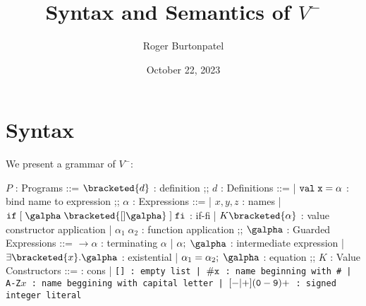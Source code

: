\documentclass[]{article}
\title{Syntax and Semantics of $V^{-}$}
\author{Roger Burtonpatel}
\date{October 22, 2023}
\begin{document}
\maketitle

\section{Syntax}

We present a grammar of $V^{-}$: 

\bigskip



\begin{center}
    \begin{bnf}
    $P$ : \textsf{Programs} ::=
    $\bracketed{d}$ : definition
    ;;
    $d$ : \textsf{Definitions} ::=
    | $\tt{val} \; x \; \tt{=} \; \alpha$ : bind name to expression
    ;;
    $\alpha$ : \textsf{Expressions} ::=
    | $x, y, z$ : names
    | $\tt{if} \; \tt{[}\; \galpha \; \bracketed{[] \galpha} \;\tt{]} \; \tt{fi}$ : if-fi 
    | $K \bracketed{\alpha}$ : value constructor application 
    | $\alpha_{1} \; \alpha_{2}$ : function application 
    ;;
    $\galpha$ : \textsf{Guarded Expressions} ::=  
    $\boldsymbol{\rightarrow}\alpha$ : terminating $\alpha$ 
    | $\alpha; \; \galpha$ : intermediate expression 
    | $\exists \bracketed{x} \tt{.} \galpha$ : existential 
    | $\alpha_{1} = \alpha_{2}; \; \galpha$ : equation 
    ;;
    $K$ : \textsf{Value Constructors} ::=
    \cons : cons 
    | \tt{[]} : empty list 
    | $\tt{\#}x$ : name beginning with \tt{\#}
    | \tt{A-Z}$x$ : name beggining with capital letter
    | $[\tt{-}\vert\tt{+}](\tt{0}-\tt{9})+$ : signed integer literal 

    \end{bnf}
\end{center}
\end{document}
